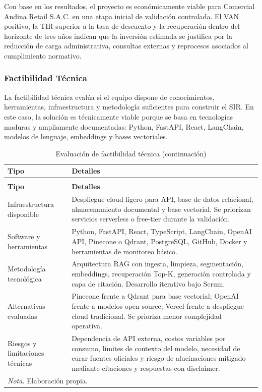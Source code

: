 \documentclass[12pt,a4paper,oneside]{report}
\begin{document}
Con base en los resultados, el proyecto es económicamente viable para Comercial Andina Retail S.A.C. en una etapa inicial de validación controlada. El VAN positivo, la TIR superior a la tasa de descuento y la recuperación dentro del horizonte de tres años indican que la inversión estimada se justifica por la reducción de carga administrativa, consultas externas y reprocesos asociados al cumplimiento normativo.

\subsubsection{Factibilidad Técnica}\label{subsubsec:factibilidad-tecnica}

La factibilidad técnica evalúa si el equipo dispone de conocimientos, herramientas, infraestructura y metodología suficientes para construir el SIR. En este caso, la solución es técnicamente viable porque se basa en tecnologías maduras y ampliamente documentadas: Python, FastAPI, React, LangChain, modelos de lenguaje, embeddings y bases vectoriales.

\begin{longtable}{@{}p{}p{}@{}}
\caption{Evaluación de factibilidad técnica}\label{tab:factibilidad-tecnica}\\
\toprule
\textbf{Tipo} & \textbf{Detalles} \\
\midrule
\endfirsthead
\caption[]{Evaluación de factibilidad técnica (continuación)}\\
\toprule
\textbf{Tipo} & \textbf{Detalles} \\
\midrule
\endhead
Infraestructura disponible & Despliegue cloud ligero para API, base de datos relacional, almacenamiento documental y base vectorial. Se priorizan servicios serverless o free-tier durante la validación. \\
Software y herramientas & Python, FastAPI, React, TypeScript, LangChain, OpenAI API, Pinecone o Qdrant, PostgreSQL, GitHub, Docker y herramientas de monitoreo básico. \\
Metodología tecnológica & Arquitectura RAG con ingesta, limpieza, segmentación, embeddings, recuperación Top-K, generación controlada y capa de citación. Desarrollo iterativo bajo Scrum. \\
Alternativas evaluadas & Pinecone frente a Qdrant para base vectorial; OpenAI frente a modelos open-source; Vercel frente a despliegue cloud tradicional. Se prioriza menor complejidad operativa. \\
Riesgos y limitaciones técnicas & Dependencia de API externa, costos variables por consumo, límites de contexto del modelo, necesidad de curar fuentes oficiales y riesgo de alucinaciones mitigado mediante citaciones y respuestas con disclaimer. \\
\bottomrule
\multicolumn{2}{p{0.94\textwidth}}{\normalsize \textit{Nota.} Elaboración propia.}\\
\end{longtable}
\end{document}
